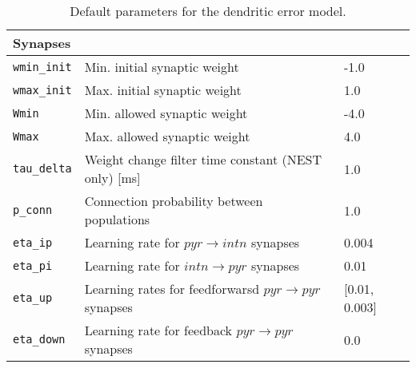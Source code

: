 \begin{table}
\begin{center}
\begin{tabular}{p{}p{}p{}}
      \\
      \textbf{Synapses}
      \\\hline
      \texttt{wmin\_init}          & Min. initial synaptic weight                                                & -1.0
      \\
      \texttt{wmax\_init}          & Max. initial synaptic weight                                                & 1.0
      \\
      \texttt{Wmin}                & Min. allowed synaptic weight                                                & -4.0
      \\
      \texttt{Wmax}                & Max. allowed synaptic weight                                                & 4.0
      \\
      \texttt{tau\_delta}          & Weight change filter time constant (NEST only) [ms]                         & 1.0
      \\

      \texttt{p\_conn}             & Connection probability between populations                                  & 1.0
      \\
      \texttt{eta\_ip}             & Learning rate for $pyr\rightarrow intn$ synapses                            & 0.004
      \\
      \texttt{eta\_pi}             & Learning rate for $intn\rightarrow pyr$ synapses                            & 0.01
      \\
      \texttt{eta\_up}             & Learning rates for feedforwarsd $pyr\rightarrow pyr$ synapses               &
      [0.01, 0.003]
      \\
      \texttt{eta\_down}           & Learning rate for feedback $pyr\rightarrow pyr$ synapses                    & 0.0
      \\
    \end{tabular}\caption{Default parameters for the dendritic error model. }\label{tab-params}
  \end{center}
\end{table}
